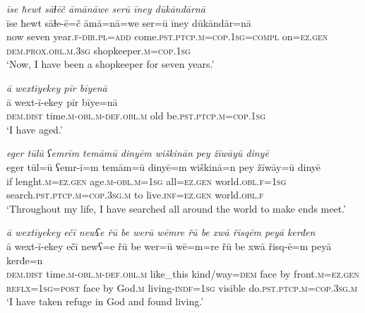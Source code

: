 \ea \label{ŽM.8}
\textit{īse ħewt sāɫēč āmānāwe serū īney dūkāndārnā} \\ 
\gll īse ħewt sāɫe-ē=č āmā=nā=we ser=ū īney dūkāndār=nā \\ 
 now seven year\textsc{.f}\textsc{-dir}\textsc{.pl}\textsc{=add} come\textsc{.pst}\textsc{.ptcp}\textsc{.m}\textsc{=cop}\textsc{.\textsc{1sg}}\textsc{=compl} on\textsc{=ez.gen} \textsc{dem.prox}\textsc{.obl}\textsc{.m}\textsc{.3sg} shopkeeper\textsc{.m}\textsc{=cop}\textsc{.\textsc{1sg}} \\ 
\glt `Now, I have been a shopkeeper for seven years.'
\z 
 
\ea \label{ŽM.10}
\textit{ā wextīyekey pīr bīyenā} \\ 
\gll ā wext-ī-ekey pīr bīye=nā \\ 
 \textsc{dem.dist} time\textsc{.m}\textsc{-obl}\textsc{.m}\textsc{-def}\textsc{.obl}\textsc{.m} old be\textsc{.pst}\textsc{.ptcp}\textsc{.m}\textsc{=cop}\textsc{.\textsc{1sg}} \\ 
\glt `I have aged.'
\z 
 
\ea \label{ŽM.13}
\textit{eger tūlū ʕemrīm temāmū dinyēm wiškinān pey žīwāyū dinyē} \\ 
\gll eger tūl=ū ʕemr-ī=m temām=ū dinyē=m wiškinā=n pey žīwāy=ū dinyē \\ 
 if lenght\textsc{.m}\textsc{=ez.gen} age\textsc{.m}\textsc{-obl}\textsc{.m}\textsc{=\textsc{1sg}} all\textsc{=ez.gen} world\textsc{.obl}\textsc{.f}\textsc{=\textsc{1sg}} search\textsc{.pst}\textsc{.ptcp}\textsc{.m}\textsc{=cop}\textsc{.3sg}\textsc{.m} to live\textsc{.inf}\textsc{=ez.gen} world\textsc{.obl}\textsc{.f} \\ 
\glt `Throughout my life, I have searched all around the world to make ends meet.'
\z 
 
\ea \label{ŽM.15}
\textit{ā wextīyekey ečī newʕe řū be werū wēmre řū be xwā řisqēm peyā kerđen} \\ 
\gll ā wext-ī-ekey ečī newʕ=e řū be wer=ū wē=m=re řū be xwā řisq-ē=m peyā kerđe=n \\ 
 \textsc{dem.dist} time\textsc{.m}\textsc{-obl}\textsc{.m}\textsc{-def}\textsc{.obl}\textsc{.m} like\_this kind/way\textsc{=dem} face by front\textsc{.m}\textsc{=ez.gen} \textsc{reflx}\textsc{=\textsc{1sg}}\textsc{=\textsc{post}} face by God\textsc{.m} living\textsc{-indf}\textsc{=\textsc{1sg}} visible do\textsc{.pst}\textsc{.ptcp}\textsc{.m}\textsc{=cop}\textsc{.3sg}\textsc{.m} \\ 
\glt `I have taken refuge in God and found living.'
\z 
 
